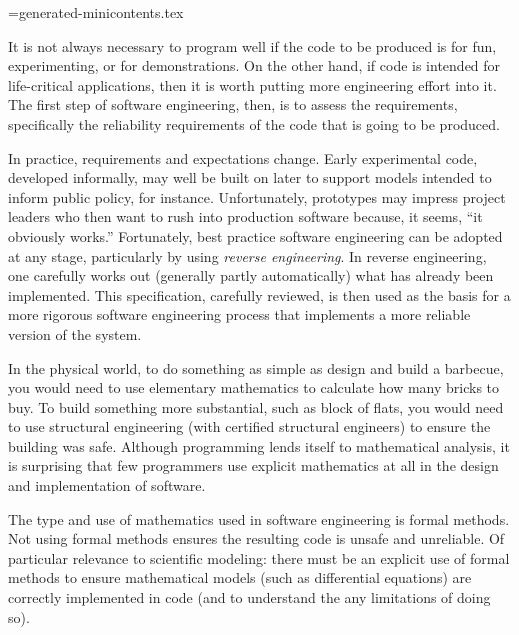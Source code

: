 \documentclass{article}
\begin{document}
\newwrite\minicontentsfile
\immediate\openout\minicontentsfile=generated-minicontents.tex

It is not always necessary to program well if the code to be produced is for fun, experimenting, or for demonstrations. On the other hand, if code is intended for life-critical applications, then it is worth putting more engineering effort into it. The first step of software engineering, then, is to assess the requirements, specifically the reliability requirements of the code that is going to be produced. 

In practice, requirements and expectations change. Early experimental code, developed informally, may well be built on later to support models intended to inform public policy, for instance. Unfortunately, prototypes may impress project leaders who then want to rush into production software because, it seems, ``it obviously works.'' Fortunately, best practice software engineering can be adopted at any stage, particularly by using \emph{reverse engineering}. In reverse engineering, one carefully works out (generally partly automatically) what has already been implemented. This specification, carefully reviewed, is then used as the basis for a more rigorous software engineering process that implements a more reliable version of the system.


{In the physical world, to do something as simple as design and build a barbecue, you would need to use elementary mathematics to calculate how many bricks to buy. To build something more substantial, such as block of flats, you would need to use structural engineering (with certified structural engineers) to ensure the building was safe. Although programming lends itself to mathematical analysis, it is surprising that few programmers use explicit mathematics at all in the design and implementation of software.} 

{The type and use of mathematics used in software engineering is formal methods. Not using formal methods ensures the resulting code is unsafe and unreliable. Of particular relevance to scientific modeling: there must be an explicit use of formal methods to ensure  mathematical models (such as differential equations) are correctly implemented in code (and to understand the any limitations of doing so).}
\end{document}
